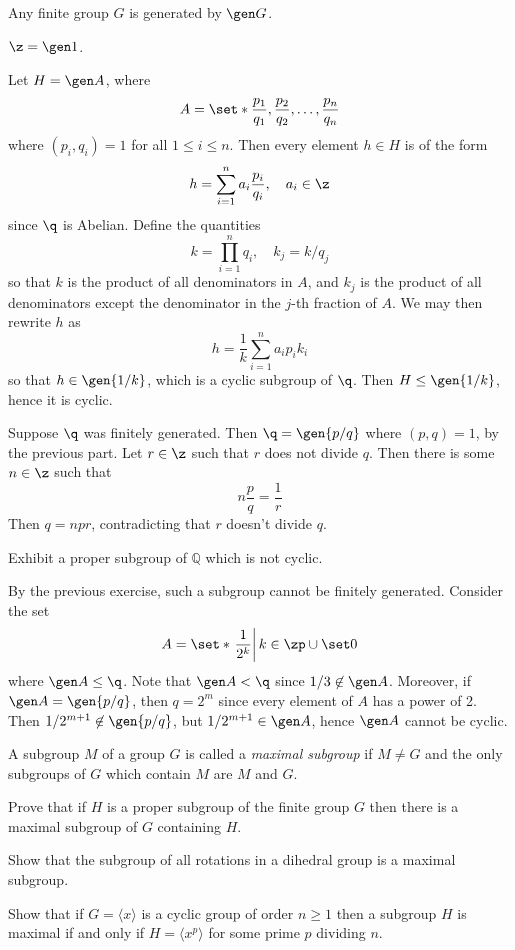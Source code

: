 \begin{solalph}
    \item Any finite group $G$ is generated by $\gen G$.
    \item $\z = \gen 1$.
    \item Let $H = \gen A$, where
    \[A = \set*{\frac{p_1}{q_1}, \frac{p_2}{q_2}, \ldots, \frac{p_n}{q_n}}\]
    where $(p_i, q_i) = 1$ for all $1 \leq i \leq n$. Then every element $h \in H$ is of the form
    \[h = \sum_{i = 1}^n a_i\frac{p_i}{q_i}, \quad a_i \in \z\]
    since $\q$ is Abelian. Define the quantities
    \[k = \prod_{i = 1}^n q_i, \quad k_j = k/q_j\]
    so that $k$ is the product of all denominators in $A$, and $k_j$ is the product of all denominators except the denominator in the $j$-th fraction of $A$. We may then rewrite $h$ as
    \[h = \frac 1k \sum_{i = 1}^n a_ip_ik_i\]
    so that $h \in \gen{1/k}$, which is a cyclic subgroup of $\q$. Then $H \leq \gen{1/k}$, hence it is cyclic.
    \item Suppose $\q$ was finitely generated. Then $\q = \gen{p/q}$ where $(p, q) = 1$, by the previous part. Let $r \in \z$ such that $r$ does not divide $q$. Then there is some $n \in \z$ such that
    \[n \frac pq = \frac 1r\]
    Then $q = npr$, contradicting that $r$ doesn't divide $q$.
\end{solalph}

\begin{exercise}\label{ex2.4.15}
    Exhibit a proper subgroup of $\mathbb{Q}$ which is not cyclic.
\end{exercise}

\begin{sol}
    By the previous exercise, such a subgroup cannot be finitely generated. Consider the set
    \[A = \set*{\left. \frac 1{2^k} \right| k \in \zp \cup \set 0}\]
    where $\gen A \leq \q$. Note that $\gen A < \q$ since $1/3 \not\in \gen A$. Moreover, if $\gen A = \gen{p/q}$, then $q = 2^m$ since every element of $A$ has a power of 2. Then $1/2^{m + 1} \not\in \gen{p/q}$, but $1/2^{m + 1} \in \gen A$, hence $\gen A$ cannot be cyclic.
\end{sol}

\begin{specialexercise}\label{ex2.4.16} 
    A subgroup $M$ of a group $G$ is called a \emph{maximal subgroup} if $M\ne G$ and the only subgroups of $G$ which contain $M$ are $M$ and $G$.
    \begin{subproblems}
        \item Prove that if $H$ is a proper subgroup of the finite group $G$ then there is a maximal subgroup of $G$ containing $H$.
        \item Show that the subgroup of all rotations in a dihedral group is a maximal subgroup.
        \item Show that if $G=\langle x\rangle$ is a cyclic group of order $n\ge 1$ then a subgroup $H$ is maximal if and only if $H=\langle x^p\rangle$ for some prime $p$ dividing $n$.
    \end{subproblems}
\end{specialexercise}

